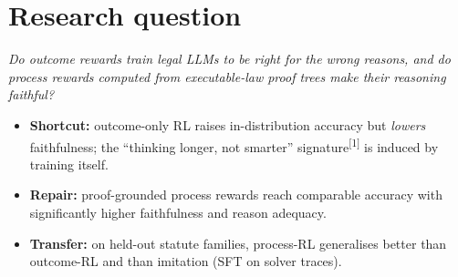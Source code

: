 \documentclass[10pt,a4paper]{article}
\newcommand{\hyp}[1]{\textbf{\color{tum}#1}}
\newcommand{\cit}[1]{\textsuperscript{\color{muted}[#1]}}
\begin{document}
\section{Research question}
\emph{Do outcome rewards train legal LLMs to be right for the wrong reasons, and do process rewards computed from executable-law proof trees make their reasoning faithful?}
\begin{itemize}
  \item[\hyp{H1}] \textbf{Shortcut:} outcome-only RL raises in-distribution accuracy but \emph{lowers} faithfulness; the ``thinking longer, not smarter'' signature\cit{1} is induced by training itself.
  \item[\hyp{H2}] \textbf{Repair:} proof-grounded process rewards reach comparable accuracy with significantly higher faithfulness and reason adequacy.
  \item[\hyp{H3}] \textbf{Transfer:} on held-out statute families, process-RL generalises better than outcome-RL and than imitation (SFT on solver traces).
\end{itemize}

\end{document}
